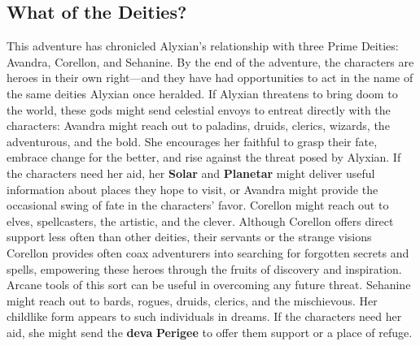 \documentclass[10pt,a4,twoside,twocolumn,openany,nodeprecatedcode]{dndbook}
\begin{document}
\subsection{What of the Deities?}
This adventure has chronicled Alyxian's relationship with three Prime Deities: Avandra, Corellon, and Sehanine. By the end of the adventure, the characters are heroes in their own right—and they have had opportunities to act in the name of the same deities Alyxian once heralded. If Alyxian threatens to bring doom to the world, these gods might send celestial envoys to entreat directly with the characters:
{{Avandra might reach out to paladins, druids, clerics, wizards, the adventurous, and the bold. She encourages her faithful to grasp their fate, embrace change for the better, and rise against the threat posed by Alyxian. If the characters need her aid, her \textbf{Solar} and \textbf{Planetar} might deliver useful information about places they hope to visit, or Avandra might provide the occasional swing of fate in the characters' favor.}}
{{Corellon might reach out to elves, spellcasters, the artistic, and the clever. Although Corellon offers direct support less often than other deities, their servants or the strange visions Corellon provides often coax adventurers into searching for forgotten secrets and spells, empowering these heroes through the fruits of discovery and inspiration. Arcane tools of this sort can be useful in overcoming any future threat.}}
{{Sehanine might reach out to bards, rogues, druids, clerics, and the mischievous. Her childlike form appears to such individuals in dreams. If the characters need her aid, she might send the \textbf{deva} \textbf{Perigee} to offer them support or a place of refuge.}}
\end{document}
